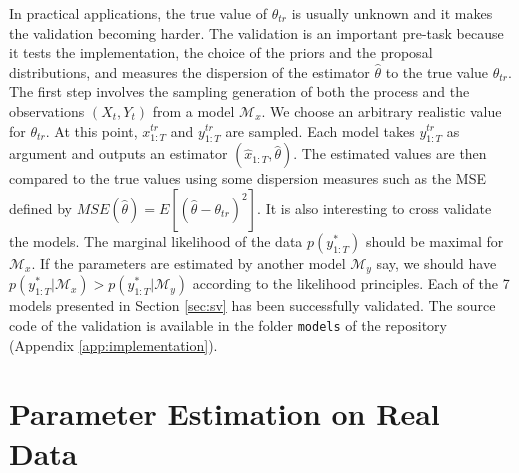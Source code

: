 \documentclass[11pt,a4,twosided,singlespacing,titlepagenumber=on]{scrreprt}
\numberwithin{equation}{chapter} %
\theoremstyle{remark}
\begin{document}
In practical applications, the true value of $\theta_{tr}$ is usually unknown and it makes the validation becoming harder. The validation is an important pre-task because it tests the implementation, the choice of the priors and the proposal distributions, and measures the dispersion of the estimator $\hat{\theta}$ to the true value $\theta_{tr}$. The first step involves the sampling generation of both the process and the observations $(X_t, Y_t)$ from a model $\mathcal{M}_x$. We choose an arbitrary realistic value for $\theta_{tr}$. At this point, $x^{tr}_{1:T}$ and $y^{tr}_{1:T}$ are sampled. Each model takes $y^{tr}_{1:T}$ as argument and outputs an estimator $(\hat{x}_{1:T}, \hat{\theta})$. The estimated values are then compared to the true values using some dispersion measures such as the MSE defined by $MSE(\hat{\theta}) = E[ ( \hat{\theta} - \theta_{tr} )^2 ]$. It is also interesting to cross validate the models. The marginal likelihood of the data $p(y^*_{1:T})$ should be maximal for $\mathcal{M}_x$. If the parameters are estimated by another model $\mathcal{M}_y$ say, we should have $p(y^*_{1:T} | \mathcal{M}_x) > p(y^*_{1:T} | \mathcal{M}_y)$ according to the likelihood principles. Each of the 7 models presented in Section \ref{sec:sv} has been successfully validated. The source code of the validation is available in the folder \texttt{models} of the repository (Appendix \ref{app:implementation}).

\section{Parameter Estimation on Real Data}
\end{document}
